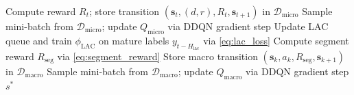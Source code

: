 \begin{algorithm}[!t]
\begin{algorithmic}[1]
            \EndIf
        \EndIf
    \EndIf
    \State Compute reward $R_t$; store transition $(\mathbf{s}_t, (d,r), R_t, \mathbf{s}_{t+1})$ in $\mathcal{D}_{\text{micro}}$
    \State Sample mini-batch from $\mathcal{D}_{\text{micro}}$; update $Q_{\text{micro}}$ via DDQN gradient step
    \State Update LAC queue and train $\phi_{\text{LAC}}$ on mature labels $y_{t-H_{\text{lac}}}$ via \eqref{eq:lac_loss}
        \State Compute segment reward $R_{\text{seg}}$ via \eqref{eq:segment_reward}
        \State Store macro transition $(\mathbf{s}_k, a_k, R_{\text{seg}}, \mathbf{s}_{k+1})$ in $\mathcal{D}_{\text{macro}}$
        \State Sample mini-batch from $\mathcal{D}_{\text{macro}}$; update $Q_{\text{macro}}$ via DDQN gradient step
    \EndIf
\EndFor
\Return $s^*$
\end{algorithmic}
\end{algorithm}
